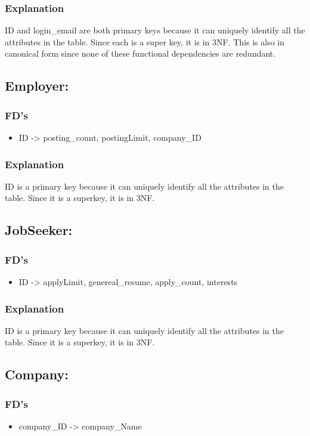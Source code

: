 \subsubsection{Explanation}
ID and login\_email are both primary keys because it can uniquely identify all the attributes in the table. Since each is a super key, it is in 3NF. This is also in canonical form since none of these functional dependencies are redundant.

\subsection{Employer:}
\subsubsection{FD's}
\begin{itemize}
    \item ID -> posting\_count, postingLimit, company\_ID
\end{itemize}

\subsubsection{Explanation}
ID is a primary key because it can uniquely identify all the attributes in the table. Since it is a superkey, it is in 3NF.

\subsection{JobSeeker:}
\subsubsection{FD's}
\begin{itemize}
    \item ID -> applyLimit, genereal\_resume, apply\_count, interests
\end{itemize}

\subsubsection{Explanation}
ID is a primary key because it can uniquely identify all the attributes in the table. Since it is a superkey, it is in 3NF.

\subsection{Company:}
\subsubsection{FD's}
\begin{itemize}
    \item company\_ID -> company\_Name
\end{itemize}

